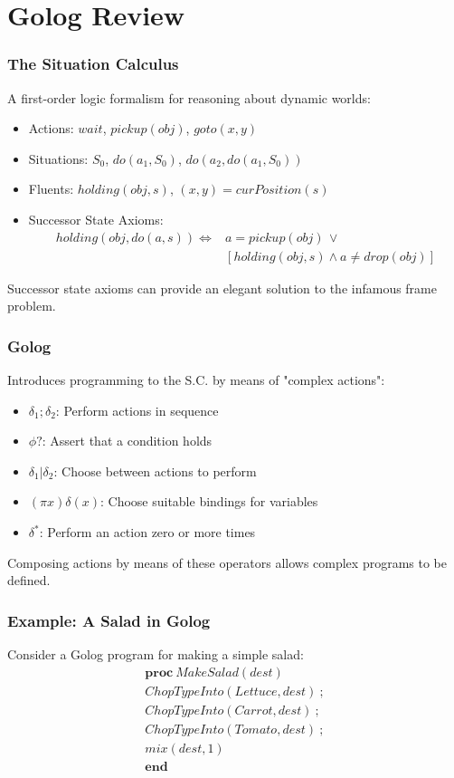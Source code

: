 \documentclass{beamer}
\begin{document}
\section{Golog Review}

\begin{frame}
\frametitle{The Situation Calculus}

A first-order logic formalism for reasoning about dynamic worlds:

\begin{itemize}
\pause
\item Actions: $wait$, $pickup(obj)$, $goto(x,y)$
\pause
\item Situations: $S_{0}$, $do(a_{1},S_{0})$, $do(a_{2},do(a_{1},S_{0}))$
\pause
\item Fluents: $holding(obj,s)$, $(x,y)=curPosition(s)$
\pause
\item Successor State Axioms:\[
\begin{array}{cc}
holding(obj,do(a,s))\iff & a=pickup(obj)\,\vee\\
 & \left[holding(obj,s)\wedge a\neq drop(obj)\right]\end{array}\]
\end{itemize}
Successor state axioms can provide an elegant solution to the infamous
frame problem.

\end{frame}

\begin{frame}
\frametitle{Golog}
Introduces programming to the S.C. by means of "complex actions":
\begin{itemize}
  \pause
  \item $\delta_1;\delta_2$: Perform actions in sequence
  \pause
  \item $\phi?$: Assert that a condition holds
  \pause
  \item $\delta_1|\delta_2$: Choose between actions to perform
  \pause
  \item $(\pi x)\delta(x)$: Choose suitable bindings for variables
  \pause
  \item $\delta^*$: Perform an action zero or more times
  \pause
\end{itemize}
Composing actions by means of these operators allows complex programs
to be defined.
\end{frame}

\begin{frame}
\frametitle{Example: A Salad in Golog}
Consider a Golog program for making a simple salad:\[
\begin{array}{c}
\mathbf{proc}\ MakeSalad(dest)\\
ChopTypeInto(Lettuce,dest)\ ;\\
ChopTypeInto(Carrot,dest)\ ;\\
ChopTypeInto(Tomato,dest)\ ;\\
mix(dest,1)\\
\mathbf{end}\end{array}\]
\end{frame}
\end{document}
